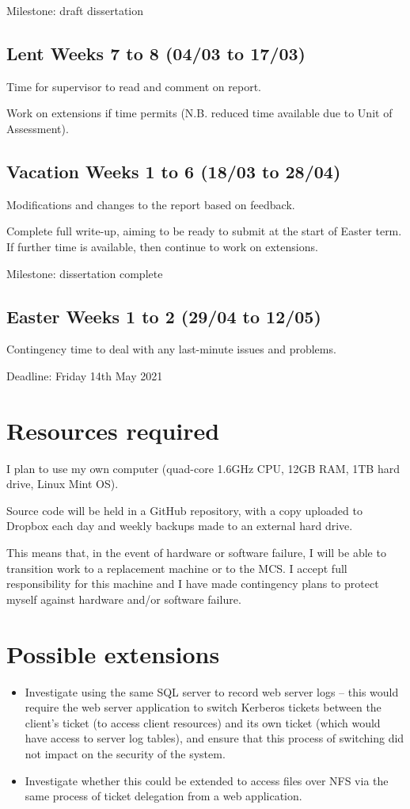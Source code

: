 \documentclass{standalone}
\begin{document}
Milestone: draft dissertation

\subsection*{Lent Weeks 7 to 8 (04/03 to 17/03)}
Time for supervisor to read and comment on report.

Work on extensions if time permits (N.B. reduced time available due to Unit of Assessment).

\subsection*{Vacation Weeks 1 to 6 (18/03 to 28/04)}
Modifications and changes to the report based on feedback.

Complete full write-up, aiming to be ready to submit at the start of Easter term. If further time is available, then continue to work on extensions.

Milestone: dissertation complete

\subsection*{Easter Weeks 1 to 2 (29/04 to 12/05)}
Contingency time to deal with any last-minute issues and problems.

Deadline: Friday 14th May 2021

\section*{Resources required}
I plan to use my own computer (quad-core 1.6GHz CPU, 12GB RAM, 1TB hard drive, Linux Mint OS).

Source code will be held in a GitHub repository, with a copy uploaded to Dropbox each day and weekly backups made to an external hard drive.

This means that, in the event of hardware or software failure, I will be able to transition work to a replacement machine or to the MCS. I accept full responsibility for this machine and I have made contingency plans to protect myself against hardware and/or software failure.

\section*{Possible extensions}
\begin{itemize}
\item Investigate using the same SQL server to record web server logs -- this would require the web server application to switch Kerberos tickets between the client's ticket (to access client resources) and its own ticket (which would have access to server log tables), and ensure that this process of switching did not impact on the security of the system.
\item Investigate whether this could be extended to access files over NFS via the same process of ticket delegation from a web application.
\end{itemize}
\end{document}
